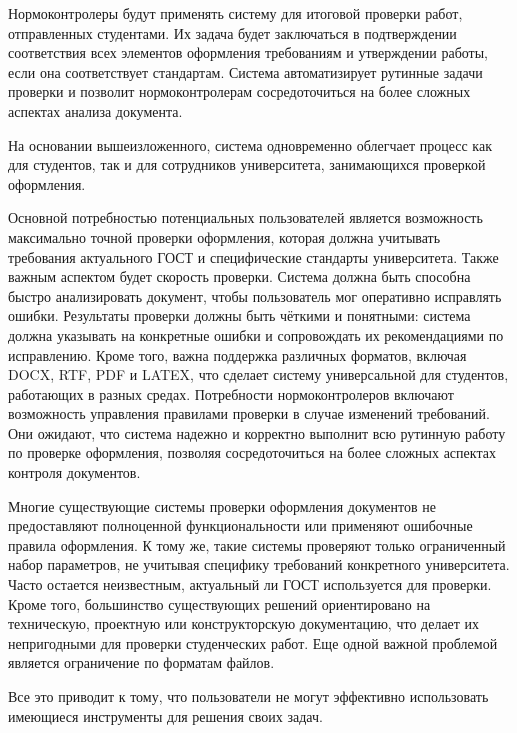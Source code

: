 \documentclass{report}
\begin{document}
Нормоконтролеры будут применять систему для итоговой проверки работ, отправленных студентами. Их задача будет заключаться в подтверждении соответствия всех элементов оформления требованиям и утверждении работы, если она соответствует стандартам. Система автоматизирует рутинные задачи проверки и позволит нормоконтролерам сосредоточиться на более сложных аспектах анализа документа.

На основании вышеизложенного, система одновременно облегчает процесс как для студентов, так и для сотрудников университета, занимающихся проверкой оформления.

Основной потребностью потенциальных пользователей является возможность максимально точной проверки оформления, которая должна учитывать требования актуального ГОСТ и специфические стандарты университета. %
Также важным аспектом будет скорость проверки. Система должна быть способна быстро анализировать документ, чтобы пользователь мог оперативно исправлять ошибки. Результаты проверки должны быть чёткими и понятными: система должна указывать на конкретные ошибки и сопровождать их рекомендациями по исправлению. Кроме того, важна поддержка различных форматов, включая DOCX, RTF, PDF и LATEX, что сделает систему универсальной для студентов, работающих в разных средах. %
Потребности нормоконтролеров включают возможность управления правилами проверки в случае изменений требований. Они ожидают, что система надежно и корректно выполнит всю рутинную работу по проверке оформления, позволяя сосредоточиться на более сложных аспектах контроля документов.

Многие существующие системы проверки оформления документов не предоставляют полноценной функциональности или применяют ошибочные правила оформления. К тому же, такие системы проверяют только ограниченный набор параметров, не учитывая специфику требований конкретного университета. Часто остается неизвестным, актуальный ли ГОСТ используется для проверки. Кроме того, большинство существующих решений ориентировано на техническую, проектную или конструкторскую документацию, что делает их непригодными для проверки студенческих работ. Еще одной важной проблемой является ограничение по форматам файлов.

Все это приводит к тому, что пользователи не могут эффективно использовать имеющиеся инструменты для решения своих задач.
\end{document}
